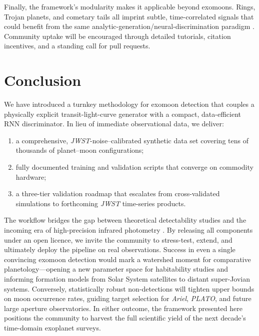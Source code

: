 \documentclass[11pt]{article}
\begin{document}
Finally, the framework’s modularity makes it applicable beyond exomoons.  Rings, Trojan planets, and cometary tails all imprint subtle, time-correlated signals that could benefit from the same analytic-generation/neural-discrimination paradigm \citep{Turner2023}.  Community uptake will be encouraged through detailed tutorials, citation incentives, and a standing call for pull requests.

\section{Conclusion}
\label{sec:conclusion}
We have introduced a turnkey methodology for exomoon detection that couples a physically explicit transit-light-curve generator with a compact, data-efficient RNN discriminator.  In lieu of immediate observational data, we deliver:

\begin{enumerate}
	\item a comprehensive, \textit{JWST}-noise–calibrated synthetic data set covering tens of thousands of planet–moon configurations;
	\item fully documented training and validation scripts that converge on commodity hardware;
	\item a three-tier validation roadmap that escalates from cross-validated simulations to forthcoming \textit{JWST} time-series products.
\end{enumerate}

The workflow bridges the gap between theoretical detectability studies \citep{Heller2014,PriceRogers2014} and the incoming era of high-precision infrared photometry \citep{Rustamkulov2024}.  By releasing all components under an open licence, we invite the community to stress-test, extend, and ultimately deploy the pipeline on real observations.  Success in even a single convincing exomoon detection would mark a watershed moment for comparative planetology—opening a new parameter space for habitability studies \citep{OxfordTarget2022} and informing formation models from Solar System satellites to distant super-Jovian systems.  Conversely, statistically robust non-detections will tighten upper bounds on moon occurrence rates, guiding target selection for \textit{Ariel}, \textit{PLATO}, and future large aperture observatories.  In either outcome, the framework presented here positions the community to harvest the full scientific yield of the next decade’s time-domain exoplanet surveys.


\end{document}
